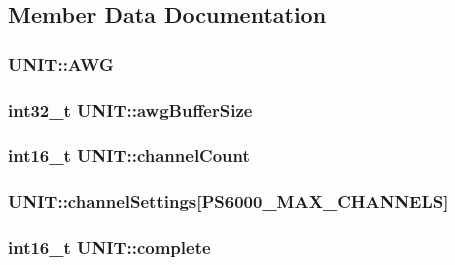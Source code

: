 \subsection{Member Data Documentation}
\subsubsection[{\texorpdfstring{A\+WG}{AWG}}]{ U\+N\+I\+T\+::\+A\+WG}\hypertarget{structUNIT_a51dcf07d6c80ef52175e6e814780bba7}{}\label{structUNIT_a51dcf07d6c80ef52175e6e814780bba7}
\subsubsection[{\texorpdfstring{awg\+Buffer\+Size}{awgBufferSize}}]{\setlength{\rightskip}{0pt plus 5cm}int32\+\_\+t U\+N\+I\+T\+::awg\+Buffer\+Size}\hypertarget{structUNIT_a4d8332ec4419a63c20e9bb7db0dd265f}{}\label{structUNIT_a4d8332ec4419a63c20e9bb7db0dd265f}
\subsubsection[{\texorpdfstring{channel\+Count}{channelCount}}]{\setlength{\rightskip}{0pt plus 5cm}int16\+\_\+t U\+N\+I\+T\+::channel\+Count}\hypertarget{structUNIT_acf5a949860c98679c62e3ca601cfd5b1}{}\label{structUNIT_acf5a949860c98679c62e3ca601cfd5b1}
\subsubsection[{\texorpdfstring{channel\+Settings}{channelSettings}}]{ U\+N\+I\+T\+::channel\+Settings\mbox{[}P\+S6000\+\_\+\+M\+A\+X\+\_\+\+C\+H\+A\+N\+N\+E\+LS\mbox{]}}\hypertarget{structUNIT_aa51b9453b7a03cb4a3ba23de2497268f}{}\label{structUNIT_aa51b9453b7a03cb4a3ba23de2497268f}
\subsubsection[{\texorpdfstring{complete}{complete}}]{\setlength{\rightskip}{0pt plus 5cm}int16\+\_\+t U\+N\+I\+T\+::complete}\hypertarget{structUNIT_a1bbb2acad0a13147f08f7c0d5359b424}{}\label{structUNIT_a1bbb2acad0a13147f08f7c0d5359b424}
